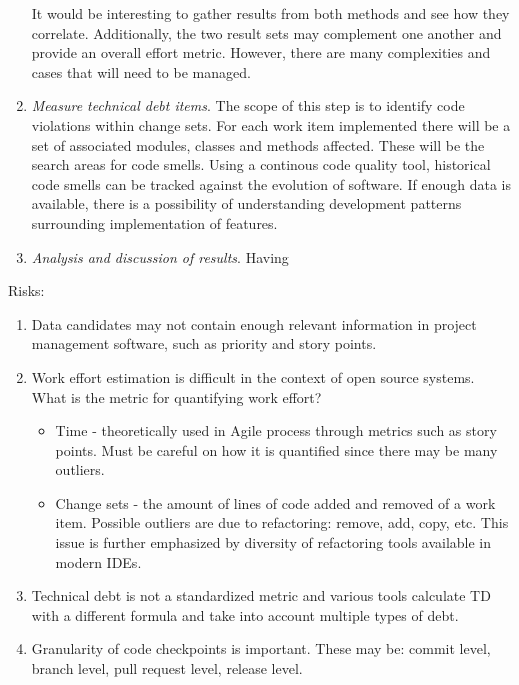 \documentclass{mprop}
\begin{document}
\begin{enumerate}
	It would be interesting to gather results from both methods and see how they
	correlate. Additionally, the two result sets may complement one another and
	provide an overall effort metric. However, there are many complexities and
	cases that will need to be managed.

	\item \textit{Measure technical debt items}. The scope of this step is to
	identify code violations within change sets. For each work item implemented
	there will be a set of associated modules, classes and methods affected.
	These will be the search areas for code smells. Using a continous code
	quality tool, historical code smells can be tracked against the evolution of
	software. If enough data is available, there is a possibility of
	understanding development patterns surrounding implementation of features.

	\item \textit{Analysis and discussion of results}. Having 

\end{enumerate}


Risks:
\begin{enumerate}
	\item Data candidates may not contain enough relevant information in
	      project management software, such as priority and story points.
	\item Work effort estimation is difficult in the context of open source
	      systems. What is the metric for quantifying work effort?
	      \begin{itemize}
		      \item Time - theoretically used in Agile process through
		            metrics such as story points. Must be careful on how it
		            is quantified since there may be many outliers.
		      \item Change sets - the amount of lines of code added and
		            removed of a work item. Possible outliers are due to
		            refactoring: remove, add, copy, etc. This issue is
		            further emphasized by diversity of refactoring tools
		            available in modern IDEs.
	      \end{itemize}
	\item Technical debt is not a standardized metric and various tools
	      calculate TD with a different formula and take into account multiple types
	      of debt.
	\item Granularity of code checkpoints is important. These may be: commit
	      level, branch level, pull request level, release level.
\end{enumerate}
\end{document}
